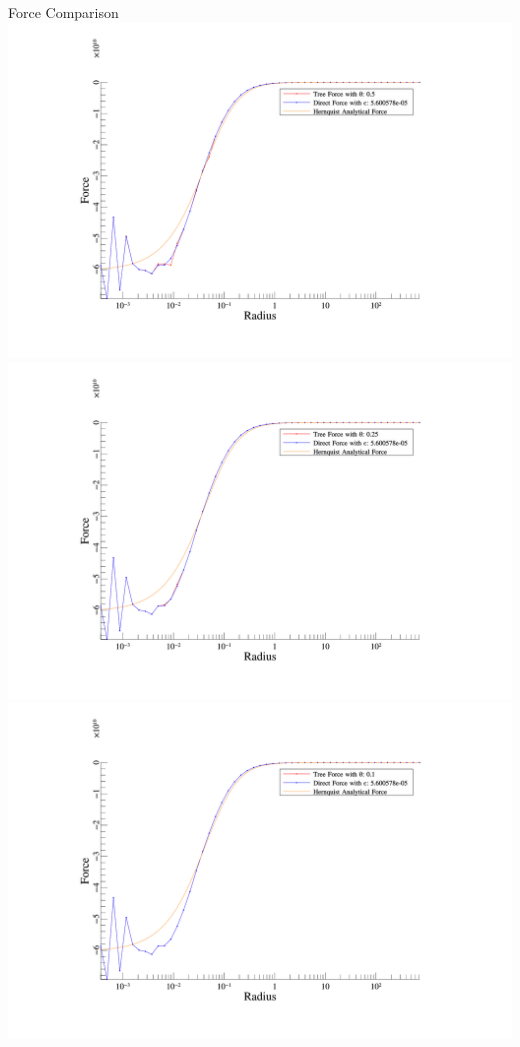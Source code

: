 \begin{frame}[allowframebreaks]{Force Comparison}
	\includegraphics[width=\textwidth]{figures/plots/tree_force_0.5.png}
	\includegraphics[width=\textwidth]{figures/plots/tree_force_0.25.png}
	\includegraphics[width=\textwidth]{figures/plots/tree_force_0.1.png}
\end{frame}

